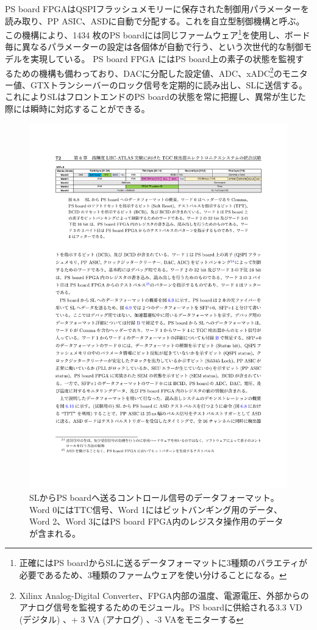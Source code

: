     PS board FPGAはQSPIフラッシュメモリーに保存された制御用パラメーターを読み取り、PP ASIC、ASDに自動で分配する。これを自立型制御機構と呼ぶ。この機構により、1434 枚のPS boardには同じファームウェア\footnote{正確にはPS boardからSLに送るデータフォーマットに3種類のバラエティが必要であるため、3種類のファームウェアを使い分けることになる。}を使用し、ボード毎に異なるパラメーターの設定は各個体が自動で行う、という次世代的な制御モデルを実現している。
    PS board FPGA にはPS board上の素子の状態を監視するための機構も備わっており、DACに分配した設定値、ADC、xADC\footnote{Xilinx Analog-Digital Converter、FPGA内部の温度、電源電圧、外部からのアナログ信号を監視するためのモジュール。PS boardに供給される3.3 VD  (デジタル) 、+ 3 VA  (アナログ) 、-3 VAをモニターする}のモニター値、GTXトランシーバーのロック信号を定期的に読み出し、SLに送信する。これによりSLはフロントエンドのPS boardの状態を常に把握し、異常が生じた際には瞬時に対応することができる。

    \begin{figure} 
        \centering
        \includegraphics[width=16cm]{fig/Intro/TGC_PSBdownlink.pdf}
        \caption[SLからPS boardへ送るコントロールデータのフォーマット]{SLからPS boardへ送るコントロール信号のデータフォーマット\cite{mt_aoki}。Word 0にはTTC信号、Word 1にはビットバンギング用のデータ、Word 2、Word 3にはPS board FPGA内のレジスタ操作用のデータが含まれる。}
        \label{TGC_PSBdownlink}
    \end{figure}
    
